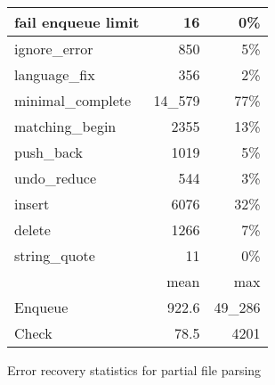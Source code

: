 \documentclass{article}
\begin{document}
\begin{figure}[H]
\begin{tabular}{| l | r | r |}
\hline
fail enqueue limit & 16      & 0\%      \\
\hline
ignore\_error      & 850     & 5\%     \\
language\_fix      & 356     & 2\%     \\
minimal\_complete  & 14\_579 & 77\%    \\
matching\_begin    & 2355    & 13\%    \\
push\_back         & 1019    & 5\%     \\
undo\_reduce       & 544     & 3\%     \\
insert             & 6076    & 32\%    \\
delete             & 1266    & 7\%     \\
string\_quote      & 11      & 0\%     \\
\hline
                   & mean    & max     \\
Enqueue            & 922.6   & 49\_286 \\
Check              & 78.5    & 4201    \\
\hline
\end{tabular}
\caption{Error recovery statistics for partial file parsing}
\label{table:partial-recover-stats}
\end{figure}
\end{document}
